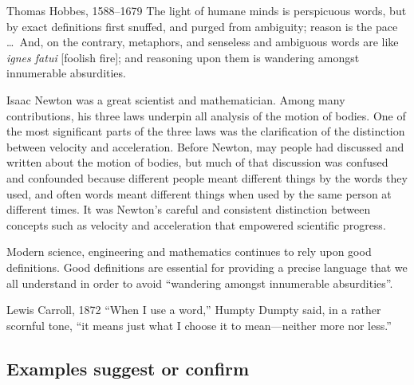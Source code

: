 \begin{draft}
\begin{quoted}{Thomas Hobbes, 1588--1679}
The light of humane minds is perspicuous words, but by exact definitions first snuffed, and purged from ambiguity; reason is the pace \ldots\ And, on the contrary, metaphors, and senseless and ambiguous words are like \emph{ignes fatui} [foolish fire]; and reasoning upon them is wandering amongst innumerable absurdities.
\end{quoted}

Isaac Newton was a great scientist and mathematician.
Among many contributions, his three laws underpin all analysis of the motion of bodies.
One of the most significant parts of the three laws was the clarification of the distinction between velocity and acceleration.
Before Newton, may people had discussed and written about the motion of bodies, but much of that discussion was confused and confounded because different people meant different things by the words they used, and often words meant different things when used by the same person at different times.
It was Newton's careful and consistent distinction between concepts such as velocity and acceleration that empowered scientific progress.

Modern science, engineering and mathematics continues to rely upon good definitions.
Good definitions are essential for providing a precise language that we all understand in order to avoid ``wandering amongst innumerable absurdities''.

\begin{quoted}{Lewis Carroll, 1872}
``When I use a word,'' Humpty Dumpty said, in a rather scornful tone, ``it means just what I choose it to mean---neither more nor less.''
\end{quoted}


\begin{comment}
Sometimes (inconsistently?) use the becomes symbol \index{:=@$:=$}\(:=\)---define here somewhere.  Define \(\in\) and \(\iff\) and \(\implies\) somewhere.  Define sets \(\{\}\) and \(\{:\}\).
\end{comment}




\subsection{Examples suggest or confirm}
\label{sec:egsc}


\end{draft}
